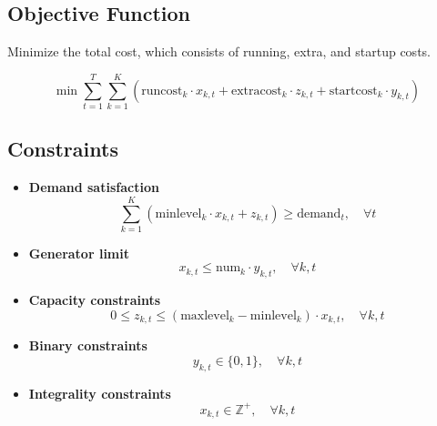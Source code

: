\documentclass{article}
\begin{document}
\subsection*{Objective Function}
Minimize the total cost, which consists of running, extra, and startup costs.

\[
\min \sum_{t=1}^{T} \sum_{k=1}^{K} \left( \text{runcost}_k \cdot x_{k,t} + \text{extracost}_k \cdot z_{k,t} + \text{startcost}_k \cdot y_{k,t} \right)
\]

\subsection*{Constraints}
\begin{itemize}
    \item \textbf{Demand satisfaction}
    \[
    \sum_{k=1}^{K} \left( \text{minlevel}_k \cdot x_{k,t} + z_{k,t} \right) \geq \text{demand}_t, \quad \forall t
    \]
    
    \item \textbf{Generator limit}
    \[
    x_{k,t} \leq \text{num}_k \cdot y_{k,t}, \quad \forall k, t
    \]
    
    \item \textbf{Capacity constraints}
    \[
    0 \leq z_{k,t} \leq (\text{maxlevel}_k - \text{minlevel}_k) \cdot x_{k,t}, \quad \forall k, t
    \]
    
    \item \textbf{Binary constraints}
    \[
    y_{k,t} \in \{0, 1\}, \quad \forall k, t
    \]
    
    \item \textbf{Integrality constraints}
    \[
    x_{k,t} \in \mathbb{Z}^+, \quad \forall k, t
    \]
\end{itemize}
\end{document}
